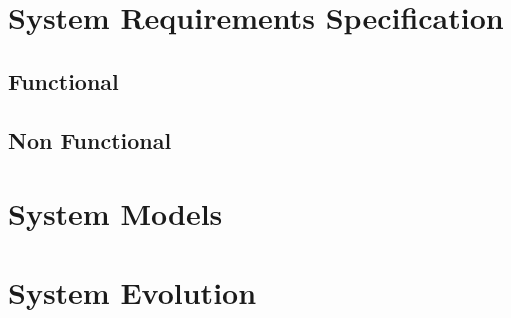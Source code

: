 \documentclass[]{IEEEtran}
\begin{document}
	\section{System Requirements Specification}
	\subsection{Functional}
	\subsection{Non Functional}
	
	\section{System Models}
	
	\section{System Evolution}
	
	\cite{test}



\end{document}
